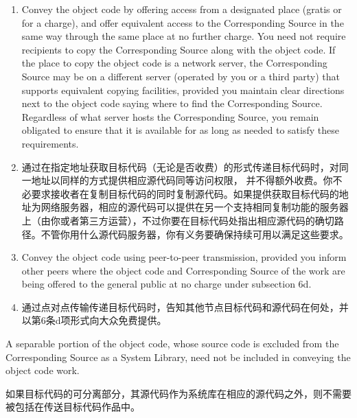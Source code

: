 \documentclass[11pt]{article}
\begin{document}
\begin{enumerate}
\begin{enumerate}
          \item Convey the object code by offering access from a designated
                place (gratis or for a charge), and offer equivalent access to the
                Corresponding Source in the same way through the same place at no
                further charge.  You need not require recipients to copy the
                Corresponding Source along with the object code.  If the place to
                copy the object code is a network server, the Corresponding Source
                may be on a different server (operated by you or a third party)
                that supports equivalent copying facilities, provided you maintain
                clear directions next to the object code saying where to find the
                Corresponding Source.  Regardless of what server hosts the
                Corresponding Source, you remain obligated to ensure that it is
                available for as long as needed to satisfy these requirements.

          \item 通过在指定地址获取目标代码（无论是否收费）的形式传递目标代码时，对同一地址以同样的方式提供相应源代码同等访问权限，
                并不得额外收费。你不必要求接收者在复制目标代码的同时复制源代码。如果提供获取目标代码的地址为网络服务器，相应的源代码可以提供在另一个支持相同复制功能的服务器
                上（由你或者第三方运营），不过你要在目标代码处指出相应源代码的确切路径。不管你用什么源代码服务器，你有义务要确保持续可用以满足这些要求。

          \item Convey the object code using peer-to-peer transmission, provided
                you inform other peers where the object code and Corresponding
                Source of the work are being offered to the general public at no
                charge under subsection 6d.

          \item 通过点对点传输传递目标代码时，告知其他节点目标代码和源代码在何处，并以第6条d项形式向大众免费提供。

        \end{enumerate}

        A separable portion of the object code, whose source code is excluded
        from the Corresponding Source as a System Library, need not be
        included in conveying the object code work.

        如果目标代码的可分离部分，其源代码作为系统库在相应的源代码之外，则不需要被包括在传送目标代码作品中。


\end{enumerate}
\end{document}
